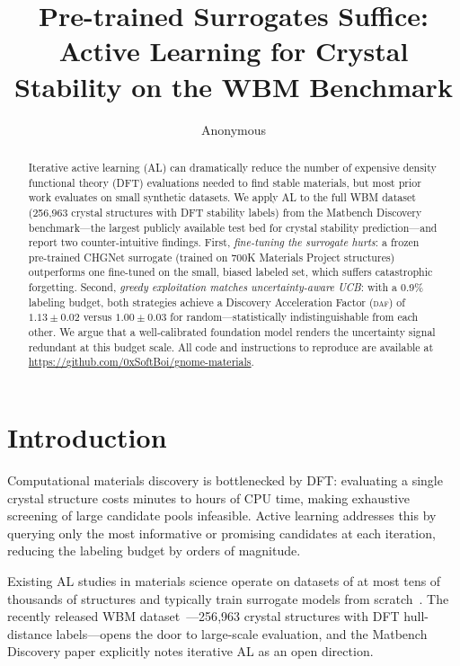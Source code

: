 \documentclass{article}
\title{Pre-trained Surrogates Suffice: Active Learning for Crystal Stability
  on the WBM Benchmark}
\author{Anonymous}
\newcommand{\daf}{\textsc{daf}\xspace}
\begin{document}
\maketitle

\begin{abstract}
Iterative active learning (AL) can dramatically reduce the number of expensive
density functional theory (DFT) evaluations needed to find stable materials, but
most prior work evaluates on small synthetic datasets.
We apply AL to the full WBM dataset (256{,}963 crystal structures with DFT
stability labels) from the Matbench Discovery benchmark---the largest publicly
available test bed for crystal stability prediction---and report two
counter-intuitive findings.
First, \emph{fine-tuning the surrogate hurts}: a frozen pre-trained CHGNet
surrogate (trained on 700K Materials Project structures) outperforms one
fine-tuned on the small, biased labeled set, which suffers catastrophic
forgetting.
Second, \emph{greedy exploitation matches uncertainty-aware UCB}: with a
0.9\% labeling budget, both strategies achieve a
Discovery Acceleration Factor (\daf) of $1.13\pm 0.02$ versus
$1.00\pm 0.03$ for random---statistically indistinguishable from each other.
We argue that a well-calibrated foundation model renders the uncertainty signal
redundant at this budget scale.
All code and instructions to reproduce are available at
\url{https://github.com/0xSoftBoi/gnome-materials}.
\end{abstract}

\section{Introduction}

Computational materials discovery is bottlenecked by DFT: evaluating a single
crystal structure costs minutes to hours of CPU time, making exhaustive screening
of large candidate pools infeasible.
Active learning addresses this by querying only the most informative or promising
candidates at each iteration, reducing the labeling budget by orders of magnitude.

Existing AL studies in materials science operate on datasets of at most tens of
thousands of structures and typically train surrogate models from
scratch~\cite{merchant2023gn,xie2018crystal}.
The recently released WBM dataset~\cite{riebesell2024matbench}---256{,}963
crystal structures with DFT hull-distance labels---opens the door to large-scale
evaluation, and the Matbench Discovery paper explicitly notes iterative AL as an
open direction.
\end{document}
